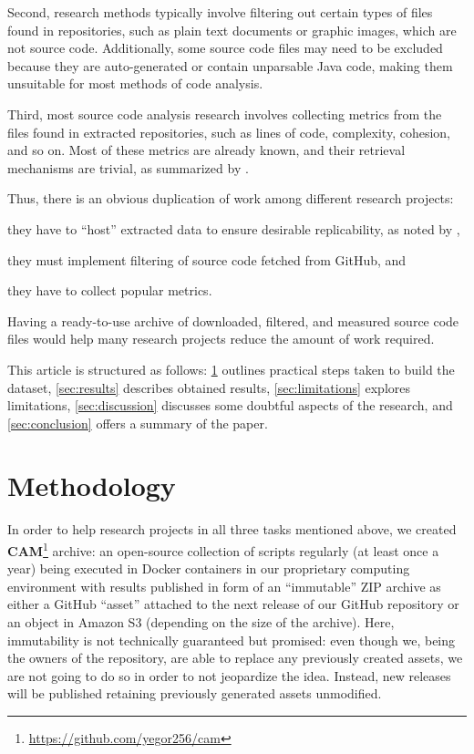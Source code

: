 \documentclass[sigplan,nonacm,review,anonymous]{acmart}
\newcommand\cam{{\sffamily\bfseries CAM}}
\begin{document}
Second, research methods typically involve filtering out certain types of files
found in repositories, such as plain text documents or graphic images, which
are not source code. Additionally, some source code files may need to be
excluded because they are auto-generated or contain unparsable Java code,
making them unsuitable for most methods of code analysis.

Third, most source code analysis research involves collecting metrics from the
files found in extracted repositories, such as lines of code, complexity,
cohesion, and so on. Most of these metrics are already known, and their
retrieval mechanisms are trivial, as summarized by \citet{nunez2017source}.

Thus, there is an obvious duplication of work among different research projects:
\begin{inparaenum}[(a)]
\item they have to ``host'' extracted data to ensure desirable replicability, as noted by \citet{7887704},
\item they must implement filtering of source code fetched from GitHub, and
\item they have to collect popular metrics.
\end{inparaenum}
Having a ready-to-use archive of downloaded, filtered, and measured source code files would help many research projects reduce the amount of work required.

This article is structured as follows:
\cref{sec:method} outlines practical steps taken to build the dataset,
\cref{sec:results} describes obtained results,
\cref{sec:limitations} explores limitations,
\cref{sec:discussion} discusses some doubtful aspects of the research,
and
\cref{sec:conclusion} offers a summary of the paper.

\section{Methodology}\label{sec:method}

In order to help research projects in all three tasks mentioned above, we
created \cam{}\footnote{\url{https://github.com/yegor256/cam}} archive: an
open-source collection of scripts regularly (at least once a year) being
executed in Docker containers in our proprietary computing environment with
results published in form of an ``immutable'' ZIP archive as either a GitHub
``asset'' attached to the next release of our GitHub repository or an object in
Amazon S3 (depending on the size of the archive). Here, immutability is not
technically guaranteed but promised: even though we, being the owners of the
repository, are able to replace any previously created assets, we are not going
to do so in order to not jeopardize the idea. Instead, new releases will be
published retaining previously generated assets unmodified.
\end{document}
